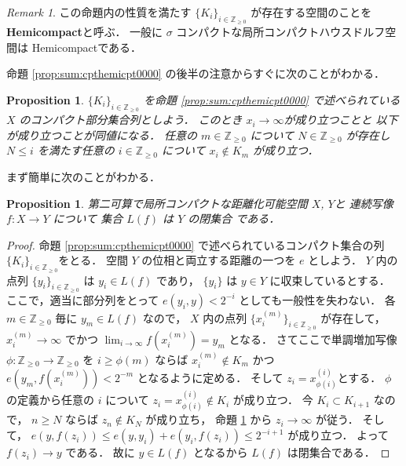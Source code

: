 \documentclass[leqno, a4paper, 12pt]{jsarticle}
\theoremstyle{plain}
\newtheorem{prop}[thm]{Proposition}
\theoremstyle{definition}
\theoremstyle{remark}
\newtheorem{rmk}{Remark}[section]
\newcommand{\zz}{\mathbb{Z}}
\newcommand{\yoemph}[1]{\textbf{#1}}
\newcommand{\yolimset}[1]{L(#1)}
\numberwithin{equation}{section}
\begin{document}
\begin{rmk}
この命題内の性質を満たす
$\{K_i\}_{i\in \zz_{\ge 0}}$
が存在する空間のことを
\yoemph{Hemicompact}と呼ぶ．
一般に
$\sigma$
コンパクトな局所コンパクトハウスドルフ空間は
Hemicompactである．
\end{rmk}



命題
\ref{prop:sum:cpthemicpt0000}
の後半の注意からすぐに次のことがわかる．
\begin{prop}\label{benri}
$\{K_{i}\}_{i\in \zz_{\ge 0}}$
を命題
\ref{prop:sum:cpthemicpt0000}
で述べられている
$X$
のコンパクト部分集合列としよう．
このとき
$x_{i}\to \infty$が成り立つことと
以下が成り立つことが同値になる．
任意の
$m\in \zz_{\ge 0}$
について
$N\in \zz_{\ge 0}$
が存在し
$N\le i$
を満たす任意の
$i\in \zz_{\ge 0}$
について
$x_{i}\not \in K_{m}$
が成り立つ．
\end{prop}


まず簡単に次のことがわかる．
\begin{prop}
第二可算で局所コンパクトな距離化可能空間
$X$, 
$Y$と
連続写像
$f\colon X\to Y$
について
集合
$\yolimset{f}$
は
$Y$
の閉集合
である．
\end{prop}
\begin{proof}
命題
\ref{prop:sum:cpthemicpt0000}
で述べられているコンパクト集合の列
$\{K_{i}\}_{i\in \zz_{\ge 0}}$をとる．
空間
$Y$
の位相と両立する距離の一つを
$e$
としよう．
$Y$
内の点列
$\{y_{i}\}_{i\in \zz_{\ge 0}}$
は
$y_{i}\in \yolimset{f}$
であり，
$\{y_{i}\}$
は
$y\in Y$
に収束しているとする．
ここで，適当に部分列をとって
$e(y_{i}, y)<2^{-i}$
としても一般性を失わない．
各
$m\in \zz_{\ge 0}$
毎に
$y_{m}\in \yolimset{f}$
なので，
$X$
内の点列
$\{x_{i}^{(m)}\}_{i\in \zz_{\ge 0}}$
が存在して，
$x_{i}^{(m)}\to \infty$
でかつ
$\lim_{i\to \infty}f(x_{i}^{(m)})=y_{m}$
となる．
さてここで単調増加写像
$\phi\colon \zz_{\ge 0}\to\zz_{\ge 0}$
を
$i\ge \phi(m)$
ならば
$x_{i}^{(m)}\not\in K_{m}$
かつ 
$e(y_{m},f(x_{i}^{(m)}))<2^{-m}$
となるように定める．
そして
$z_{i}=x_{\phi(i)}^{(i)}$とする．
$\phi$
の定義から任意の
$i$
について
$z_{i}=x_{\phi(i)}^{(i)}\not\in K_{i}$
が成り立つ．
今
$K_{i} \subset K_{i+1}$
なので，
$n\ge N$
ならば
$z_n\not\in K_{N}$
が成り立ち，
命題
\ref{benri}
から
$z_{i}\to \infty$
が従う．
そして，
$e(y, f(z_{i}))\le e(y, y_{i})+e(y_{i}, f(z_{i}))\le 2^{-i+1}$
が成り立つ．
よって
$f(z_{i})\to y$
である．
故に
$y\in \yolimset{f}$
となるから
$\yolimset{f}$
は閉集合である．
\end{proof}
\end{document}
